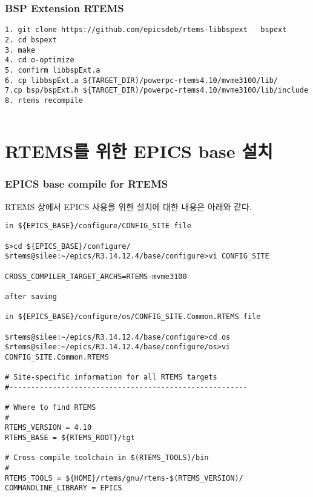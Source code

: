 \documentclass[11pt
  , a4paper
  , article
  , oneside
]{memoir}
\begin{document}
\subsection*{BSP Extension RTEMS}
\begin{lstlisting}[style=termstyle]
1. git clone https://github.com/epicsdeb/rtems-libbspext   bspext
2. cd bspext 
3. make
4. cd o-optimize
5. confirm libbspExt.a
6. cp libbspExt.a ${TARGET_DIR)/powerpc-rtems4.10/mvme3100/lib/
7.cp bsp/bspExt.h ${TARGET_DIR)/powerpc-rtems4.10/mvme3100/lib/include
8. rtems recompile


\end{lstlisting}

\chapter{RTEMS를 위한 EPICS base 설치}
\subsection*{EPICS base compile for RTEMS} 
RTEMS 상\cite{epics}\cite{epics_on_rtems}에서 EPICS 사용을 위한  설치에 대한 내용은 아래와 같다.

\begin{lstlisting}[style=termstyle]
in ${EPICS_BASE}/configure/CONFIG_SITE file

$>cd ${EPICS_BASE}/configure/
$rtems@silee:~/epics/R3.14.12.4/base/configure>vi CONFIG_SITE

CROSS_COMPILER_TARGET_ARCHS=RTEMS-mvme3100

after saving

in ${EPICS_BASE}/configure/os/CONFIG_SITE.Common.RTEMS file

$rtems@silee:~/epics/R3.14.12.4/base/configure>cd os
$rtems@silee:~/epics/R3.14.12.4/base/configure/os>vi CONFIG_SITE.Common.RTEMS

# Site-specific information for all RTEMS targets
#-------------------------------------------------------

# Where to find RTEMS
#
RTEMS_VERSION = 4.10
RTEMS_BASE = ${RTEMS_ROOT}/tgt

# Cross-compile toolchain in $(RTEMS_TOOLS)/bin
#
RTEMS_TOOLS = ${HOME}/rtems/gnu/rtems-$(RTEMS_VERSION)/
COMMANDLINE_LIBRARY = EPICS

\end{lstlisting}
\end{document}
